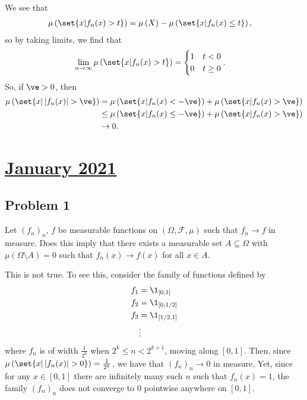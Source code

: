 \documentclass[10pt]{mypackage}
\begin{document}
We see that
\begin{align*}
  \mu\left( \set{x | f_n(x) > t} \right) &= \mu\left( X \right) - \mu\left( \set{x | f_n(x) \leq t} \right),
\end{align*}
so by taking limits, we find that
\begin{align*}
  \lim_{n\rightarrow\infty} \mu\left( \set{x | f_n(x) > t} \right) &= \begin{cases}
    1 & t < 0\\
    0 & t\geq 0
  \end{cases}.
\end{align*}
So, if $\ve > 0$, then
\begin{align*}
  \mu\left( \set{x | \left\vert f_n(x) \right\vert > \ve} \right) &= \mu\left( \set{x | f_n(x) < -\ve} \right) + \mu\left( \set{x | f_n(x) > \ve} \right)\\
                                                                  &\leq \mu\left( \set{x | f_n(x)\leq -\ve} \right) + \mu\left( \set{x | f_n(x) > \ve} \right)\\
                                                                  &\rightarrow 0.
\end{align*}
\section{\href{https://math.virginia.edu/graduate/exams/analysis/2021Jan_real.pdf}{January 2021}}%
\subsection{Problem 1}%
\begin{problem}
  Let $\left( f_n \right)_n$, $f$ be measurable functions on $\left( \Omega,\mathcal{F},\mu \right)$ such that $f_n\rightarrow f$ in measure. Does this imply that there exists a measurable set $A\subseteq \Omega$ with $\mu\left( \Omega\setminus A \right) = 0$ such that $f_n(x)\rightarrow f(x)$ for all $x\in A$.
\end{problem}

This is not true. To see this, consider the family of functions defined by
\begin{align*}
  f_1 &= \1_{[0,1]}\\
  f_2 &= \1_{[0,1/2]}\\
  f_3 &= \1_{[1/2,1]}\\
      &\vdots
\end{align*}
where $f_n$ is of width $\frac{1}{2^{k}}$ when $2^{k} \leq n < 2^{k+1}$, moving along $[0,1]$. Then, since $\mu\left( \set{x | \left\vert f_n(x) \right\vert > 0} \right) = \frac{1}{2^{k}}$, we have that $\left( f_n \right)_n\rightarrow 0$ in measure. Yet, since for any $x\in [0,1]$ there are infinitely many such $n$ such that $f_n(x) = 1$, the family $\left( f_n \right)_n$ does not converge to $0$ pointwise anywhere on $[0,1]$.
\end{document}
